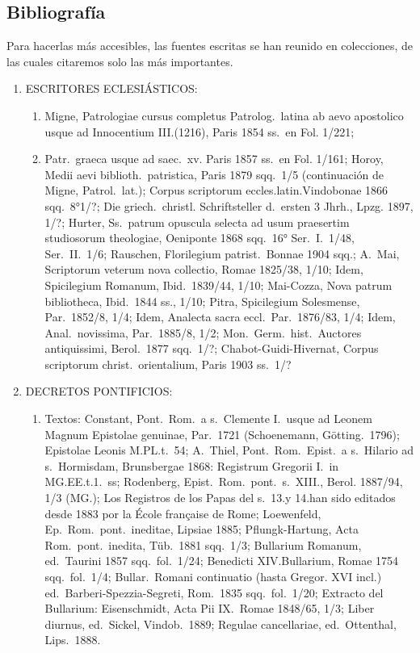 \raggedbottom{} \documentclass[12pt, a4paper, openany]{book} %
\begin{document}
\subsection{Bibliografía} Para hacerlas más accesibles, las fuentes escritas se han reunido en
colecciones, de las cuales citaremos solo las más importantes.
\begin{enumerate}
  \item ESCRITORES ECLESIÁSTICOS:\@ \begin{enumerate}
          \item Migne, Patrologiae cursus completus Patrolog.\ latina ab aevo apostolico usque ad Innocentium III.\@ (1216), Paris 1854 ss.\ en Fol. 1/221;
          \item Patr.\ graeca usque ad saec.\ xv. Paris 1857 ss.\ en Fol. 1/161; Horoy, Medii aevi biblioth.\ patristica, Paris 1879 sqq.\ 1/5 (continuación de Migne, Patrol.\ lat.\@); Corpus scriptorum eccles.\@ latin.\@ Vindobonae 1866 sqq.\ 8°1/?; Die griech.\ christl. Schriftsteller d.\ ersten 3 Jhrh., Lpzg. 1897, 1/?; Hurter, Ss.\ patrum opuscula selecta ad usum praesertim studiosorum theologiae, Oeniponte 1868 sqq.\ 16° Ser.\ I.\ 1/48, Ser.\ II.\ 1/6; Rauschen, Florilegium patrist.\ Bonnae 1904 sqq.; A.\ Mai, Scriptorum veterum nova collectio, Romae 1825/38, 1/10; Idem, Spicilegium Romanum, Ibid.\ 1839/44, 1/10; Mai-Cozza, Nova patrum bibliotheca, Ibid.\ 1844 ss., 1/10; Pitra, Spicilegium Solesmense, Par.\ 1852/8, 1/4; Idem, Analecta sacra eccl.\ Par.\ 1876/83, 1/4; Idem, Anal.\ novissima, Par.\ 1885/8, 1/2; Mon.\ Germ.\ hist.\ Auctores antiquissimi, Berol.\ 1877 sqq.\ 1/?; Chabot-Guidi-Hivernat, Corpus scriptorum christ.\ orientalium, Paris 1903 ss.\ 1/?
        \end{enumerate}
  \item DECRETOS PONTIFICIOS:\@ \begin{enumerate}
          \item Textos: Constant, Pont.\ Rom.\ a s.\ Clemente I.\ usque ad Leonem Magnum Epistolae genuinae, Par.\ 1721 (Schoenemann, Götting.\ 1796); Epistolae Leonis M.\@ PL.\@ t.\ 54; A.\ Thiel, Pont.\ Rom.\ Epist.\ a s.\ Hilario ad s.\ Hormisdam, Brunsbergae 1868: Registrum Gregorii I.\ in MG.\@ EE.\@ t.\@ 1.\ ss; Rodenberg, Epist.\ Rom.\ pont.\ s.\ XIII., Berol. 1887/94, 1/3 (MG.); Los Registros de los Papas del s.\ 13.\@ y 14.\@ han sido editados desde 1883 por la École française de Rome; Loewenfeld, Ep.\ Rom.\ pont.\ ineditae, Lipsiae 1885; Pflungk-Hartung, Acta Rom.\ pont.\ inedita, Tüb.\ 1881 sqq.\ 1/3; Bullarium Romanum, ed.\ Taurini 1857 sqq.\ fol.\ 1/24; Benedicti XIV.\@ Bullarium, Romae 1754 sqq.\ fol.\ 1/4; Bullar.\ Romani continuatio (hasta Gregor. XVI incl.) ed.\ Barberi-Spezzia-Segreti, Rom.\ 1835 sqq.\ fol.\ 1/20; Extracto del Bullarium: Eisenschmidt, Acta Pii IX.\ Romae 1848/65, 1/3; Liber diurnus, ed.\ Sickel, Vindob.\ 1889; Regulae cancellariae, ed.\ Ottenthal, Lips.\ 1888.

\end{enumerate}
\end{enumerate}
\end{document}
